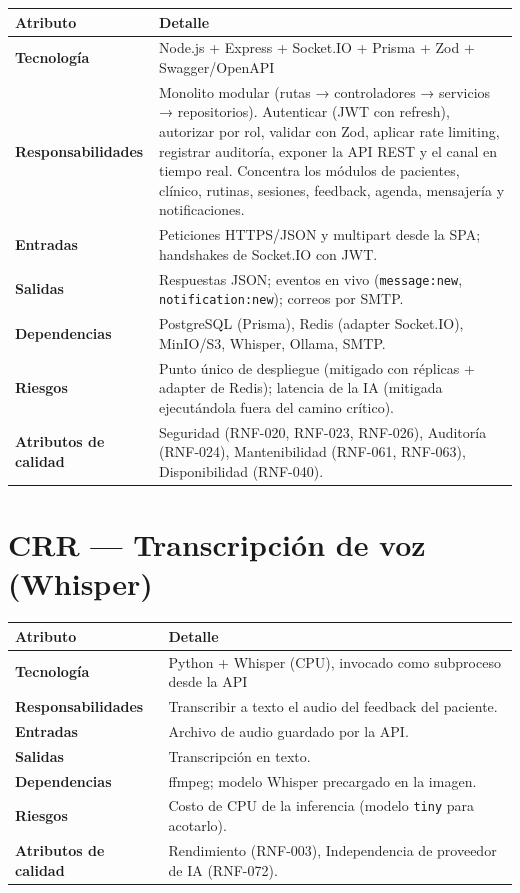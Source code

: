 \begin{tabularx}{\textwidth}{>{\bfseries}L{3.5cm} X}
  \toprule
  \textbf{\color{fmAccent}Atributo} & \textbf{\color{fmAccent}Detalle} \\
  \midrule
  Tecnología & Node.js + Express + Socket.IO + Prisma + Zod + Swagger/OpenAPI \\
  Responsabilidades & Monolito modular (rutas → controladores → servicios → repositorios). Autenticar (JWT con refresh), autorizar por rol, validar con Zod, aplicar rate limiting, registrar auditoría, exponer la API REST y el canal en tiempo real. Concentra los módulos de pacientes, clínico, rutinas, sesiones, feedback, agenda, mensajería y notificaciones. \\
  Entradas & Peticiones HTTPS/JSON y multipart desde la SPA; handshakes de Socket.IO con JWT. \\
  Salidas & Respuestas JSON; eventos en vivo (\texttt{message:new}, \texttt{notification:new}); correos por SMTP. \\
  Dependencias & PostgreSQL (Prisma), Redis (adapter Socket.IO), MinIO/S3, Whisper, Ollama, SMTP. \\
  Riesgos & Punto único de despliegue (mitigado con réplicas + adapter de Redis); latencia de la IA (mitigada ejecutándola fuera del camino crítico). \\
  Atributos de calidad & Seguridad (RNF-020, RNF-023, RNF-026), Auditoría (RNF-024), Mantenibilidad (RNF-061, RNF-063), Disponibilidad (RNF-040). \\
  \bottomrule
\end{tabularx}

\section{CRR --- Transcripción de voz (Whisper)}

\begin{tabularx}{\textwidth}{>{\bfseries}L{3.5cm} X}
  \toprule
  \textbf{\color{fmAccent}Atributo} & \textbf{\color{fmAccent}Detalle} \\
  \midrule
  Tecnología & Python + Whisper (CPU), invocado como subproceso desde la API \\
  Responsabilidades & Transcribir a texto el audio del feedback del paciente. \\
  Entradas & Archivo de audio guardado por la API. \\
  Salidas & Transcripción en texto. \\
  Dependencias & ffmpeg; modelo Whisper precargado en la imagen. \\
  Riesgos & Costo de CPU de la inferencia (modelo \texttt{tiny} para acotarlo). \\
  Atributos de calidad & Rendimiento (RNF-003), Independencia de proveedor de IA (RNF-072). \\
  \bottomrule
\end{tabularx}

